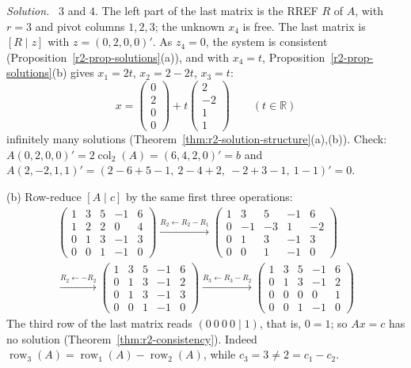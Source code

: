 \documentclass[12pt]{article}
\newcommand{\R}{\mathbb R}
\DeclareMathOperator{\row}{row}
\DeclareMathOperator{\col}{col}
\theoremstyle{definition}
\newenvironment{solution}{\par\noindent\textit{Solution.}\ }{\par\smallskip}
\begin{document}
\begin{solution}
\(3\) and \(4\). The left part of the last matrix is the RREF \(R\) of \(A\), with \(r=3\) and pivot
columns \(1,2,3\); the unknown \(x_4\) is free. The last matrix is \([R\mid z]\) with
\(z=(0,2,0,0)'\). As \(z_4=0\), the system is consistent (Proposition~\ref{r2-prop-solutions}(a)),
and with \(x_4=t\), Proposition~\ref{r2-prop-solutions}(b) gives \(x_1=2t\), \(x_2=2-2t\), \(x_3=t\):
\[
x=\begin{pmatrix}0\\2\\0\\0\end{pmatrix}+t\begin{pmatrix}2\\-2\\1\\1\end{pmatrix}\qquad(t\in\R)
\]
infinitely many solutions (Theorem~\ref{thm:r2-solution-structure}(a),(b)). Check:
\(A(0,2,0,0)'=2\col_2(A)=(6,4,2,0)'=b\) and
\(A(2,-2,1,1)'=(2-6+5-1,\ 2-4+2,\ -2+3-1,\ 1-1)'=0\).

(b) Row-reduce \([A\mid c]\) by the same first three operations:
\[
\begin{gathered}
\left(\begin{array}{cccc|c}1&3&5&-1&6\\1&2&2&0&4\\0&1&3&-1&3\\0&0&1&-1&0\end{array}\right)
\xrightarrow{R_2\leftarrow R_2-R_1}
\left(\begin{array}{cccc|c}1&3&5&-1&6\\0&-1&-3&1&-2\\0&1&3&-1&3\\0&0&1&-1&0\end{array}\right)
\\
\xrightarrow{R_2\leftarrow-R_2}
\left(\begin{array}{cccc|c}1&3&5&-1&6\\0&1&3&-1&2\\0&1&3&-1&3\\0&0&1&-1&0\end{array}\right)
\xrightarrow{R_3\leftarrow R_3-R_2}
\left(\begin{array}{cccc|c}1&3&5&-1&6\\0&1&3&-1&2\\0&0&0&0&1\\0&0&1&-1&0\end{array}\right)
\end{gathered}
\]
The third row of the last matrix reads \((0\ 0\ 0\ 0\mid1)\), that is, \(0=1\); so \(Ax=c\) has no
solution (Theorem~\ref{thm:r2-consistency}). Indeed \(\row_3(A)=\row_1(A)-\row_2(A)\), while
\(c_3=3\ne2=c_1-c_2\).
\end{solution}
\end{document}
